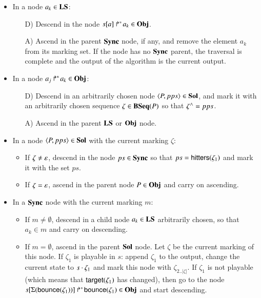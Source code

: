\begin{itemize}
  \item In a node $a_k \in \mathbf{LS}$:
    \begin{itemize}
      \item[D)] Descend in the node $\mbox{${s[a]}\Rsh^*\!a_k$} \in \mathbf{Obj}$.
      \item[A)] Ascend in the parent $\mathbf{Sync}$ node, if any,
        and remove the element $a_k$ from its marking set.
        If the node has no $\mathbf{Sync}$ parent, the traversal is complete
        and the output of the algorithm is the current output.
    \end{itemize}
  
  \item In a node $\mbox{$a_j\Rsh^*\!a_k$} \in \mathbf{Obj}$:
    \begin{itemize}
      \item[D)] Descend in an arbitrarily chosen node $\langle P, pps \rangle \in \mathbf{Sol}$,
        and mark it with an arbitrarily chosen sequence
        $\zeta \in \mathbf{BSeq}(P)$ so that $\zeta^\wedge = pps$.
      \item[A)] Ascend in the parent $\mathbf{LS}$ or $\mathbf{Obj}$ node.
    \end{itemize}
  
  \item In a node $\langle P, pps \rangle \in \mathbf{Sol}$ with the current marking $\zeta$:
    \begin{itemize}
      \item If $\zeta \neq \varepsilon$,
        descend in the node $ps \in \mathbf{Sync}$
        so that $ps = \mathsf{hitters}(\zeta_1)$
        and mark it with the set $ps$.
      \item If $\zeta = \varepsilon$,
        ascend in the parent node $P \in \mathbf{Obj}$ and carry on ascending.
    \end{itemize}
  
  \item In a $\mathbf{Sync}$ node with the current marking $m$:
    \begin{itemize}
      \item If $m \neq \emptyset$,
        descend in a child node $a_k \in \mathbf{LS}$ arbitrarily chosen,
        so that $a_k \in m$ and carry on descending.
      \item If $m = \emptyset$,
        ascend in the parent $\mathbf{Sol}$ node.
        Let $\zeta$ be the current marking of this node.
        If $\zeta_1$ is playable in $s$:
          append $\zeta_1$ to the output,
          change the current state to $s \cdot \zeta_1$
          and mark this node with $\zeta_{2..|\zeta|}$.
        If $\zeta_1$ is not playable
        (which means that $\mathsf{target}(\zeta_1)$ has changed),
          then go to the node $\mbox{${s[\Sigma(\mathsf{bounce}(\zeta_1))]}\Rsh^*\!\mathsf{bounce}(\zeta_1)$} \in \mathbf{Obj}$
          and start descending.
    \end{itemize}
\end{itemize}

